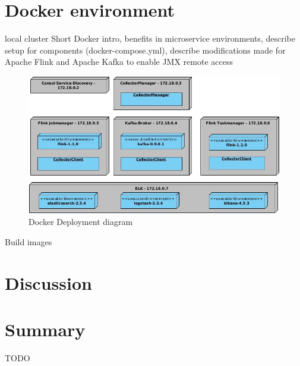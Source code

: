 \section{Docker environment}
%
local cluster
Short Docker intro, benefits in microservice environments, describe setup for components (docker-compose.yml),
describe modifications made for Apache Flink and Apache Kafka to enable JMX remote access

\begin{figure}[H]
	\centering
	\includegraphics[width=1.0\textwidth]{../uml/deployment-diagram.jpg}
	\caption{Docker Deployment diagram}
	\label{img:deployment-diagram}
\end{figure}

Build images



%
%

\section{Discussion}
\section{Summary}

TODO

